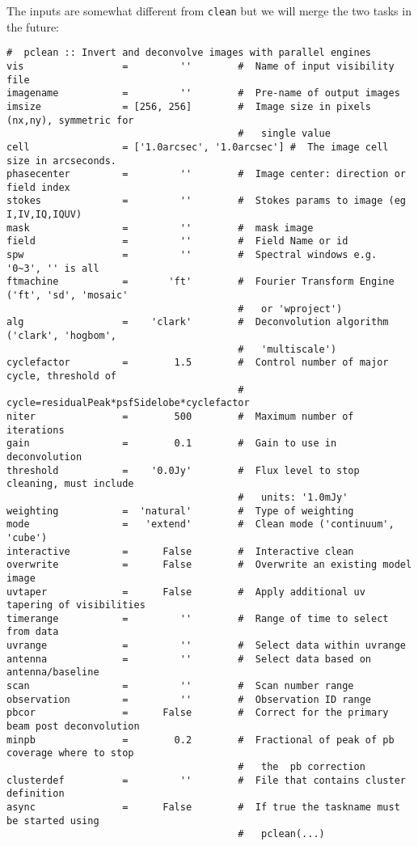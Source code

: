 The inputs are somewhat different from {\tt clean} but we will merge
the two tasks in the future: 
\small
\begin{verbatim}
#  pclean :: Invert and deconvolve images with parallel engines
vis                 =         ''        #  Name of input visibility file
imagename           =         ''        #  Pre-name of output images
imsize              = [256, 256]        #  Image size in pixels (nx,ny), symmetric for
                                        #   single value
cell                = ['1.0arcsec', '1.0arcsec'] #  The image cell size in arcseconds.
phasecenter         =         ''        #  Image center: direction or field index
stokes              =         ''        #  Stokes params to image (eg I,IV,IQ,IQUV)
mask                =         ''        #  mask image
field               =         ''        #  Field Name or id
spw                 =         ''        #  Spectral windows e.g. '0~3', '' is all
ftmachine           =       'ft'        #  Fourier Transform Engine ('ft', 'sd', 'mosaic'
                                        #   or 'wproject')
alg                 =    'clark'        #  Deconvolution algorithm ('clark', 'hogbom',
                                        #   'multiscale')
cyclefactor         =        1.5        #  Control number of major cycle, threshold of
                                        #   cycle=residualPeak*psfSidelobe*cyclefactor
niter               =        500        #  Maximum number of iterations
gain                =        0.1        #  Gain to use in deconvolution
threshold           =    '0.0Jy'        #  Flux level to stop cleaning, must include
                                        #   units: '1.0mJy'
weighting           =  'natural'        #  Type of weighting
mode                =   'extend'        #  Clean mode ('continuum', 'cube')
interactive         =      False        #  Interactive clean
overwrite           =      False        #  Overwrite an existing model image
uvtaper             =      False        #  Apply additional uv tapering of visibilities
timerange           =         ''        #  Range of time to select from data
uvrange             =         ''        #  Select data within uvrange
antenna             =         ''        #  Select data based on antenna/baseline
scan                =         ''        #  Scan number range
observation         =         ''        #  Observation ID range
pbcor               =      False        #  Correct for the primary beam post deconvolution
minpb               =        0.2        #  Fractional of peak of pb coverage where to stop
                                        #   the  pb correction
clusterdef          =         ''        #  File that contains cluster definition
async               =      False        #  If true the taskname must be started using
                                        #   pclean(...)
\end{verbatim}
\normalsize

